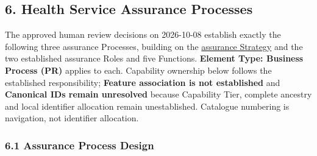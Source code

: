 \par\smallskip
{}\label{rad:processes:347}



\label{rad:processes:349}
\subsection*{6. Health Service Assurance Processes}
\label{rad:processes:351}

The approved human review decisions on 2026-10-08 establish exactly the following three assurance Processes, building on the \hyperref[rad:assurance-strategy]{assurance Strategy} and the two established assurance Roles and five Functions. \textbf{Element Type: Business Process (PR)} applies to each. Capability ownership below follows the established responsibility; \textbf{Feature association is not established} and \textbf{Canonical IDs remain unresolved} because Capability Tier, complete ancestry and local identifier allocation remain unestablished. Catalogue numbering is navigation, not identifier allocation.

\label{rad:processes:353}



\label{rad:processes:355}
\subsubsection*{6.1 Assurance Process Design}
\label{rad:processes:357}

